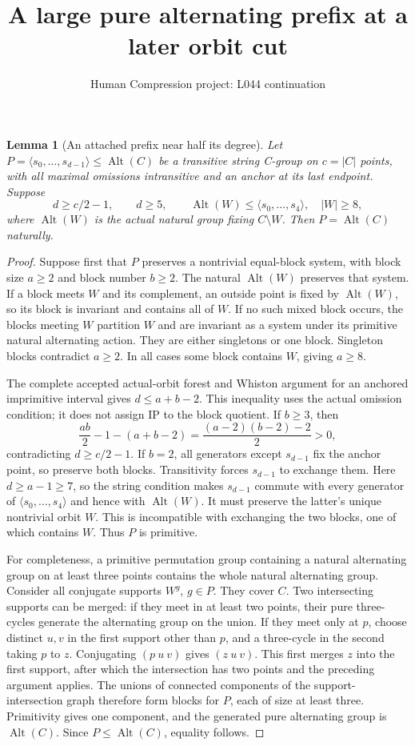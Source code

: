 \documentclass[11pt,a4paper]{article}
\title{A large pure alternating prefix at a later orbit cut}
\author{Human Compression project: L044 continuation}
\date{}
\newtheorem{lemma}{Lemma}
\newcommand{\gen}[1]{\langle#1\rangle}
\newcommand{\Alt}{\operatorname{Alt}}
\begin{document}
\maketitle
\begin{lemma}[An attached prefix near half its degree]
Let $P=\gen{s_0,\ldots,s_{d-1}}\le\Alt(C)$ be a transitive
string C-group on $c=|C|$ points, with all maximal omissions
intransitive and an anchor at its last endpoint. Suppose
\[
 d\ge c/2-1,\qquad d\ge5,\qquad
 \Alt(W)\le\gen{s_0,\ldots,s_4},\quad |W|\ge8,
\]
where $\Alt(W)$ is the actual natural group fixing $C\setminus W$.
Then $P=\Alt(C)$ naturally.
\end{lemma}
\begin{proof}
Suppose first that $P$ preserves a nontrivial equal-block system,
with block size $a\ge2$ and block number $b\ge2$.
The natural $\Alt(W)$ preserves that system. If a block meets
$W$ and its complement, an outside point is fixed by $\Alt(W)$,
so its block is invariant and contains all of $W$.
If no such mixed block occurs, the blocks meeting $W$ partition
$W$ and are invariant as a system under its primitive natural
alternating action. They are either singletons or one block.
Singleton blocks contradict $a\ge2$. In all cases some block
contains $W$, giving $a\ge8$.

The complete accepted actual-orbit forest and Whiston argument
for an anchored imprimitive interval gives $d\le a+b-2$.
This inequality uses the actual omission condition; it does not
assign IP to the block quotient. If $b\ge3$, then
\[
 \frac{ab}{2}-1-(a+b-2)
       =\frac{(a-2)(b-2)-2}{2}>0,
\]
contradicting $d\ge c/2-1$.
If $b=2$, all generators except $s_{d-1}$ fix the anchor point,
so preserve both blocks. Transitivity forces $s_{d-1}$ to
exchange them. Here $d\ge a-1\ge7$, so the string condition
makes $s_{d-1}$ commute with every generator of
$\gen{s_0,\ldots,s_4}$ and hence with $\Alt(W)$.
It must preserve the latter's unique nontrivial orbit $W$.
This is incompatible with exchanging the two blocks, one of
which contains $W$. Thus $P$ is primitive.

For completeness, a primitive permutation group containing a
natural alternating group on at least three points contains the
whole natural alternating group. Consider all conjugate supports
$W^g$, $g\in P$. They cover $C$. Two intersecting supports
can be merged: if they meet in at least two points, their pure
three-cycles generate the alternating group on the union.
If they meet only at $p$, choose distinct $u,v$ in the first
support other than $p$, and a three-cycle in the second taking
$p$ to $z$. Conjugating $(p\ u\ v)$ gives $(z\ u\ v)$.
This first merges $z$ into the first support, after which the
intersection has two points and the preceding argument applies.
The unions of connected components of the support-intersection
graph therefore form blocks for $P$, each of size at least three.
Primitivity gives one component, and the generated pure alternating
group is $\Alt(C)$. Since $P\le\Alt(C)$, equality follows.
\end{proof}
\end{document}
